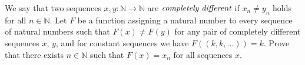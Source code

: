 We say that two sequences $x,y \colon \mathbb{N} \to \mathbb{N}$ are $\emph{completely different}$ if $x_n \neq y_n$ holds for all $n\in \mathbb{N}$. Let $F$ be a function assigning a natural number to every sequence of natural numbers such that $F(x)\neq F(y)$ for any pair of completely different sequences $x$, $y$, and for constant sequences we have $F \left((k,k,\dots)\right)=k$. Prove that there exists $n\in \mathbb{N}$ such that $F(x)=x_{n}$ for all sequences $x$.